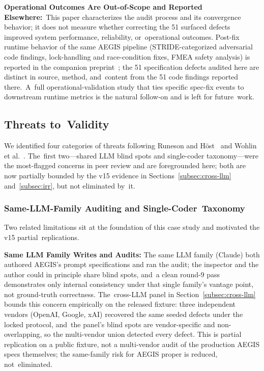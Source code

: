\documentclass[software,article,accept,pdftex,oneauthor]{Definitions/mdpi}
\begin{document}
\textbf{Operational Outcomes Are Out-of-Scope and Reported Elsewhere:}~This paper characterizes the audit process and its convergence behavior; it does not measure whether correcting the 51 surfaced defects improved system performance, reliability, or~operational outcomes. Post-fix runtime behavior of the same AEGIS pipeline (STRIDE-categorized adversarial code findings, lock-handling and race-condition fixes, FMEA safety analysis) is reported in the companion preprint~\cite{calboreanu2026aegis_companion}; the 51 specification defects audited here are distinct in source, method, and~content from the 51 code findings reported there.~A~full operational-validation study that ties specific spec-fix events to downstream runtime metrics is the natural follow-on and is left for future~work.

\subsection{Threats to~Validity}
\label{subsec:threats}

We identified four categories of threats following Runeson and H{\"o}st~\cite{runeson2009guidelines} and Wohlin et al.~\cite{wohlin2012experimentation}. The~first two---shared LLM blind spots and single-coder taxonomy---were the most-flagged concerns in peer review and are foregrounded here; both are now partially bounded by the v15 evidence in Sections~\ref{subsec:cross-llm} and~\ref{subsec:irr}, but not eliminated by~it.

\subsubsection{Same-LLM-Family Auditing and Single-Coder~Taxonomy}
\label{subsec:threat-family-coder}

Two related limitations sit at the foundation of this case study and motivated the v15 partial~replications.

\textbf{Same LLM Family Writes and Audits:} The same LLM family (Claude) both authored AEGIS's prompt specifications and ran the audit; the inspector and the author could in principle share blind spots, and~a clean round-9 pass demonstrates only internal consistency under that single family's vantage point, not ground-truth correctness. The~cross-LLM panel in Section~\ref{subsec:cross-llm} bounds this concern empirically on the released fixture: three independent vendors (OpenAI, Google, xAI) recovered the same seeded defects under the locked protocol, and~the panel's blind spots are vendor-specific and non-overlapping, so the multi-vendor union detected every defect. This is partial replication on a public fixture, not a multi-vendor audit of the production AEGIS specs themselves; the same-family risk for AEGIS proper is reduced, not~eliminated.
\end{document}
